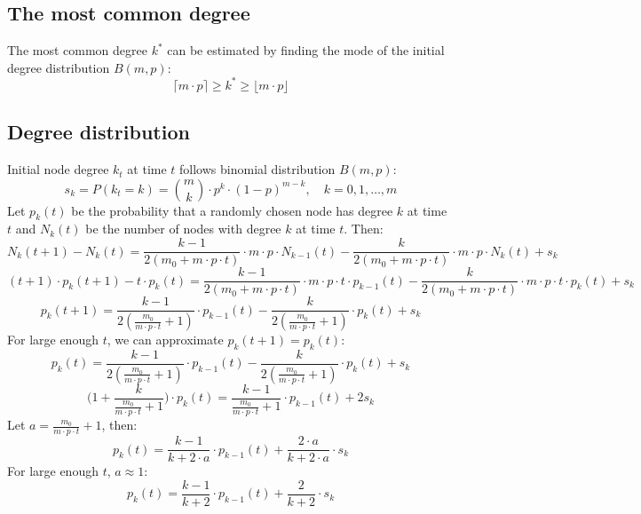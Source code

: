 \documentclass{article}
\begin{document}
\subsection*{The most common degree}
The most common degree $k^*$ can be estimated by finding the mode of the initial degree distribution $B(m, p)$:
\begin{equation}
    \lceil m \cdot p \rceil \geq k^* \geq \lfloor m \cdot p \rfloor
\end{equation}

\subsection*{Degree distribution}
Initial node degree $k_t$ at time $t$ follows binomial distribution $B(m, p)$:
\begin{equation}
    s_k = P(k_t = k) = \binom{m}{k} \cdot p^k \cdot (1 - p)^{m - k}, \quad k = 0, 1, \ldots, m
\end{equation}
Let $p_k(t)$ be the probability that a randomly chosen node has degree $k$ at time $t$ and $N_k(t)$ be the number of nodes with degree $k$ at time $t$. Then:
\begin{equation}
    N_k(t+1) - N_k(t) = \frac{k - 1}{2(m_0 + m  \cdot  p  \cdot t)} \cdot m \cdot p \cdot N_{k - 1}(t) - \frac{k}{2(m_0 + m  \cdot  p  \cdot t)} \cdot m \cdot p \cdot N_k(t) + s_k
\end{equation}
\begin{equation}
    (t+1) \cdot p_k(t+1) - t \cdot p_k(t) = \frac{k - 1}{2(m_0 + m  \cdot  p  \cdot t)} \cdot m \cdot p \cdot t \cdot p_{k - 1}(t) - \frac{k}{2(m_0 + m  \cdot  p  \cdot t)} \cdot m \cdot p \cdot t \cdot p_k(t) + s_k
\end{equation}
\begin{equation}
    p_k(t+1) = \frac{k - 1}{2(\frac{m_0}{m \cdot p \cdot t} + 1)} \cdot p_{k - 1}(t) - \frac{k}{2(\frac{m_0}{m \cdot p \cdot t} + 1)} \cdot p_k(t) + s_k
\end{equation}
For large enough $t$, we can approximate $p_k(t+1) = p_k(t)$:
\begin{equation}
    p_k(t) = \frac{k - 1}{2(\frac{m_0}{m \cdot p \cdot t} + 1)} \cdot p_{k - 1}(t) - \frac{k}{2(\frac{m_0}{m \cdot p \cdot t} + 1)} \cdot p_k(t) + s_k    
\end{equation}
\begin{equation}
    \!\big(1+ \frac{k}{\frac{m_0}{m \cdot p \cdot t} + 1}\big) \cdot p_k(t) = \frac{k - 1}{\frac{m_0}{m \cdot p \cdot t} + 1} \cdot p_{k - 1}(t) + 2s_k
\end{equation}
Let $a = \frac{m_0}{m \cdot p \cdot t} + 1$, then:
\begin{equation}
    p_k(t) = \frac{k-1}{k + 2 \cdot a} \cdot p_{k - 1}(t) + \frac{2 \cdot a}{k + 2 \cdot a} \cdot s_k
\end{equation}
For large enough $t$, $a \approx 1$:
\begin{equation}
    p_k(t) = \frac{k-1}{k + 2} \cdot p_{k - 1}(t) + \frac{2}{k + 2} \cdot s_k
\end{equation}
\end{document}
